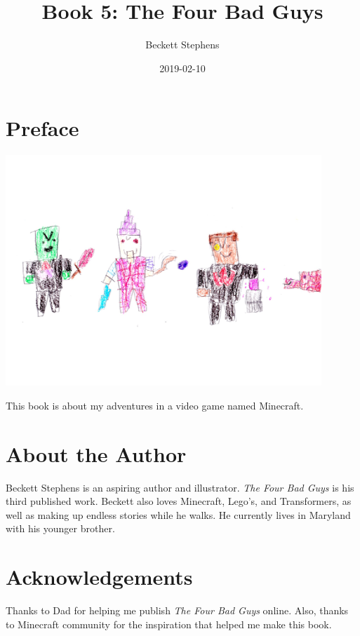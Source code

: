 \documentclass[12pt,oneside]{krantz}
\title{Book 5: The Four Bad Guys}
\author{Beckett Stephens}
\date{2019-02-10}
\begin{document}
\maketitle

{
\setcounter{tocdepth}{1}
\tableofcontents
}
\hypertarget{preface}{%
\chapter*{Preface}\label{preface}}


\includegraphics[width=4.6875in,height=\textheight]{img/05-four-bad-guys.jpg}

This book is about my adventures in a video game named Minecraft.

\hypertarget{about-the-author}{%
\chapter*{About the Author}\label{about-the-author}}


Beckett Stephens is an aspiring author and illustrator. \emph{The Four
Bad Guys} is his third published work. Beckett also loves Minecraft,
Lego's, and Transformers, as well as making up endless stories while he
walks. He currently lives in Maryland with his younger brother.

\hypertarget{acknowledgements}{%
\chapter*{Acknowledgements}\label{acknowledgements}}


Thanks to Dad for helping me publish \emph{The Four Bad Guys} online.
Also, thanks to Minecraft community for the inspiration that helped me
make this book.
\end{document}
